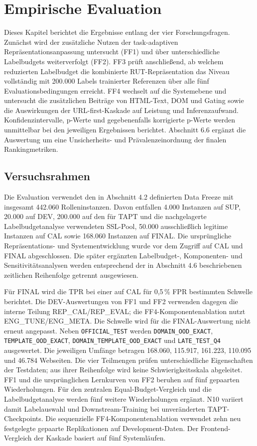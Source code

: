 \chapter{Empirische Evaluation}

Dieses Kapitel berichtet die Ergebnisse entlang der vier Forschungsfragen. Zunächst wird der
zusätzliche Nutzen der task-adaptiven Repräsentationsanpassung untersucht (FF1) und über
unterschiedliche Labelbudgets weiterverfolgt (FF2). FF3 prüft anschließend, ab welchem
reduzierten Labelbudget die kombinierte RUT-Repräsentation das Niveau vollständig mit
200.000 Labels trainierter Referenzen über alle fünf Evaluationsbedingungen erreicht. FF4
wechselt auf die Systemebene und untersucht die zusätzlichen Beiträge von HTML-Text, DOM
und Gating sowie die Auswirkungen der URL-first-Kaskade auf Leistung und Inferenzaufwand.
Konfidenzintervalle, p-Werte und gegebenenfalls korrigierte p-Werte werden unmittelbar bei den
jeweiligen Ergebnissen berichtet. Abschnitt 6.6 ergänzt die Auswertung um eine Unsicherheits-
und Prävalenzeinordnung der finalen Rankingmetriken.

\section{Versuchsrahmen}

Die Evaluation verwendet den in Abschnitt 4.2 definierten Data Freeze mit insgesamt
442.060 Rolleninstanzen. Davon entfallen 4.000 Instanzen auf SUP, 20.000 auf DEV, 200.000
auf den für TAPT und die nachgelagerte Labelbudgetanalyse verwendeten SSL-Pool, 50.000
ausschließlich legitime Instanzen auf CAL sowie 168.060 Instanzen auf FINAL. Die
ursprüngliche Repräsentations- und Systementwicklung wurde vor dem Zugriff auf CAL und
FINAL abgeschlossen. Die später ergänzten Labelbudget-, Komponenten- und
Sensitivitätsanalysen werden entsprechend der in Abschnitt 4.6 beschriebenen zeitlichen
Reihenfolge getrennt ausgewiesen.

Für FINAL wird die TPR bei einer auf CAL für 0,5\,\% FPR bestimmten Schwelle
berichtet. Die DEV-Auswertungen von FF1 und FF2 verwenden dagegen die interne
Teilung REP\_CAL/REP\_EVAL; die FF4-Komponentenablation nutzt ENG\_TUNE/ENG\_META. Die Schwelle wird für die FINAL-Auswertung nicht erneut
angepasst. Neben \nolinkurl{OFFICIAL_TEST} werden \nolinkurl{DOMAIN_OOD_EXACT},
\nolinkurl{TEMPLATE_OOD_EXACT}, \nolinkurl{DOMAIN_TEMPLATE_OOD_EXACT} und
\nolinkurl{LATE_TEST_Q4} ausgewertet. Die jeweiligen Umfänge betragen 168.060, 115.917,
161.223, 110.095 und 46.784 Webseiten. Die vier Teilmengen prüfen unterschiedliche
Eigenschaften der Testdaten; aus ihrer Reihenfolge wird keine Schwierigkeitsskala abgeleitet. FF1 und die ursprünglichen Lernkurven von FF2 beruhen auf fünf gepaarten Wiederholungen.
Für den zentralen Equal-Budget-Vergleich und die Labelbudgetanalyse werden fünf weitere
Wiederholungen ergänzt. N10 variiert damit Labelauswahl und Downstream-Training bei
unveränderten TAPT-Checkpoints. Die sequenzielle FF4-Komponentenablation verwendet zehn
neu festgelegte gepaarte Replikationen auf Development-Daten. Der Frontend-Vergleich der
Kaskade basiert auf fünf Systemläufen.


